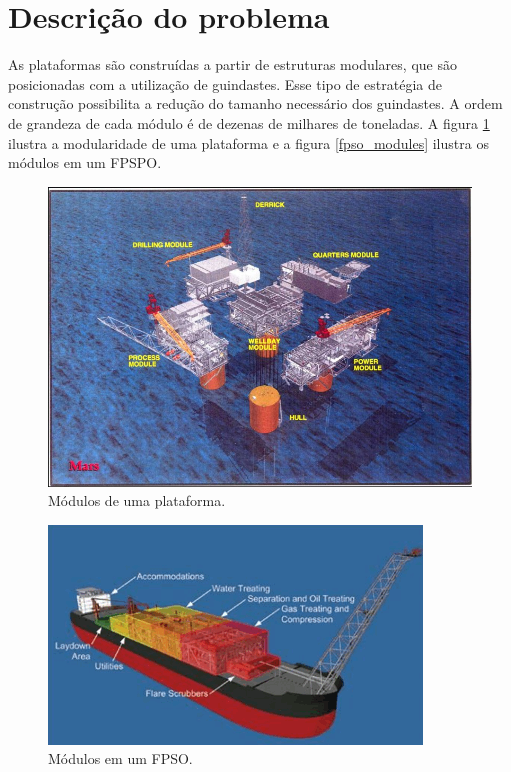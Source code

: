 \section{Descrição do problema}

As plataformas são construídas a partir de estruturas modulares, que são
posicionadas com a utilização de guindastes. Esse tipo de estratégia de
construção possibilita a redução do tamanho necessário dos guindastes. A ordem
de grandeza de cada módulo é de dezenas de milhares de toneladas. A
figura \ref{modulos} ilustra a modularidade de uma plataforma e a figura
\ref{fpso_modules} ilustra os módulos em um FPSPO.

 \begin{figure}[h!]
    \centering
    \includegraphics[width=0.9\columnwidth]{figs/mating/modules}
    \caption{Módulos de uma plataforma.}
    \label{modulos}
\end{figure}

\begin{figure}[h!]
    \centering
    \includegraphics[width=0.9\columnwidth]{figs/mating/fpso_modules}
    \caption{Módulos em um FPSO.}
    \label{fpso_modulos}
\end{figure}



